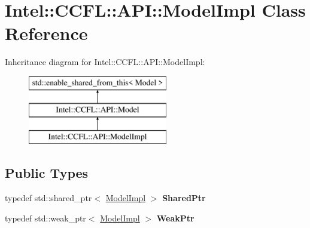 \hypertarget{classIntel_1_1CCFL_1_1API_1_1ModelImpl}{}\section{Intel\+:\+:C\+C\+F\+L\+:\+:A\+P\+I\+:\+:Model\+Impl Class Reference}
\label{classIntel_1_1CCFL_1_1API_1_1ModelImpl}
Inheritance diagram for Intel\+:\+:C\+C\+F\+L\+:\+:A\+P\+I\+:\+:Model\+Impl\+:\begin{figure}[H]
\begin{center}
\leavevmode
\includegraphics[height=3.000000cm]{classIntel_1_1CCFL_1_1API_1_1ModelImpl}
\end{center}
\end{figure}
\subsection*{Public Types}
\begin{DoxyCompactItemize}
\item 
\hypertarget{classIntel_1_1CCFL_1_1API_1_1ModelImpl_ac2868350b141e5db12f24cbea34afe80}{}typedef std\+::shared\+\_\+ptr$<$ \hyperlink{classIntel_1_1CCFL_1_1API_1_1ModelImpl}{Model\+Impl} $>$ {\bfseries Shared\+Ptr}\label{classIntel_1_1CCFL_1_1API_1_1ModelImpl_ac2868350b141e5db12f24cbea34afe80}

\item 
\hypertarget{classIntel_1_1CCFL_1_1API_1_1ModelImpl_a1cd5a9a00631de73dbc5fc0a523ad5e2}{}typedef std\+::weak\+\_\+ptr$<$ \hyperlink{classIntel_1_1CCFL_1_1API_1_1ModelImpl}{Model\+Impl} $>$ {\bfseries Weak\+Ptr}\label{classIntel_1_1CCFL_1_1API_1_1ModelImpl_a1cd5a9a00631de73dbc5fc0a523ad5e2}

\end{DoxyCompactItemize}
